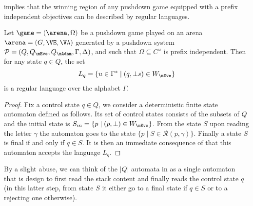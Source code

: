  implies that the winning region of any pushdown game equipped with a prefix independent objectives can be described by regular languages.

\begin{theorem}\label{11-thm:regularity-wr}
Let $\game=(\arena,\Omega)$ be a pushdown game played on an arena $\arena = (G,\VE,\VA)$ generated by a pushdown system $\PDS = (Q,Q_{\mEve}, Q_{\mAdam}, \Gamma,\Delta)$, and such that $\Omega\subseteq C^\omega$ is prefix independent. Then for any state $q\in Q$, the set \[
L_q=\{u\in \Gamma^*\mid (q,\bot s)\in W_\mEve \}
\] is a regular language over the alphabet $\Gamma$.
\end{theorem}

\begin{proof}
Fix a control state $q \in Q$, we consider a deterministic finite state automaton defined as follows. Its set of control states consists of the subsets of $Q$ and the initial state is $S_{in}=\{p\mid (p,\bot)\in W_\mEve\}$. From the state $S$ upon reading the letter $\gamma$ the automaton goes to the state $\{p\mid S\in\mathcal{R}(p,\gamma)\}$. Finally a state $S$ is final if and only if $q\in S$. It is then an immediate consequence of  that this automaton accepts the language $L_q$.
\end{proof}


\begin{remark}\label{11-rk:automata-winning-region}
By a slight abuse, we can think of the $|Q|$ automata in 	as a single automaton that is design to first read the stack content and finally reads the control state $q$ (in this latter step, from state $S$ it either go to a final state if $q\in S$ or to a rejecting one otherwise).
\end{remark}


